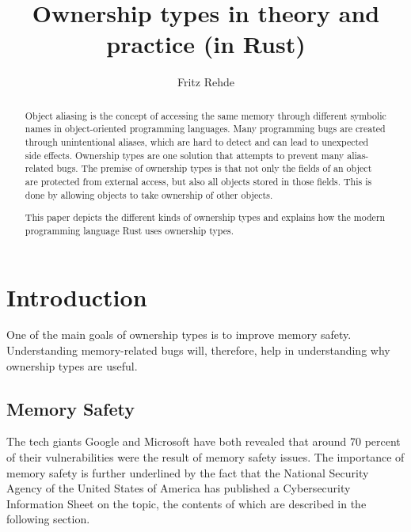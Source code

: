 \documentclass[sigplan,11pt,nonacm]{acmart}
\begin{document}
\title{Ownership types in theory and practice (in Rust)}
\author{Fritz Rehde}

\begin{abstract}

Object aliasing is the concept of accessing the same memory through different symbolic names in object-oriented programming languages.
Many programming bugs are created through unintentional aliases, which are hard to detect and can lead to unexpected side effects.
Ownership types are one solution that attempts to prevent many alias-related bugs.
The premise of ownership types is that not only the fields of an object are protected from external access, but also all objects stored in those fields.
This is done by allowing objects to take ownership of other objects.

This paper depicts the different kinds of ownership types and explains how the modern programming language Rust uses ownership types.

\end{abstract}


\maketitle

\section{Introduction}
\label{sec:introduction}

One of the main goals of ownership types is to improve memory safety.
Understanding memory-related bugs will, therefore, help in understanding why ownership types are useful.


\subsection{Memory Safety}
\label{sec:memory-safety}


The tech giants Google \cite{google-memory-safety} and Microsoft \cite{microsoft-memory-safety} have both revealed that around 70 percent of their vulnerabilities were the result of memory safety issues.
The importance of memory safety is further underlined by the fact that the National Security Agency of the United States of America has published a Cybersecurity Information Sheet \cite{nsa-memory-safety} on the topic, the contents of which are described in the following section.
\end{document}
